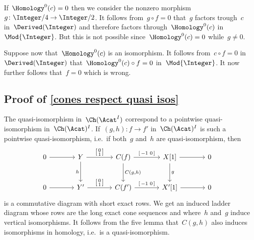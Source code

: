 \documentclass[a4paper,10pt]{scrartcl}
\begin{document}
If~$\Homology^0(c) = 0$ then we consider the nonzero morphism~$g \colon \Integer/4 \to \Integer/2$.
It follows from~$g \circ f = 0$ that~$g$ factors trough~$c$ in~$\Derived(\Integer)$ and therefore factors through~$\Homology^0(c)$ in~$\Mod{\Integer}$.
But this is not possible since~$\Homology^0(c) = 0$ while~$g \neq 0$.

Suppose now that~$\Homology^0(c)$ is an isomorphism.
It follows from~$c \circ f = 0$ in~$\Derived(\Integer)$ that~$\Homology^0(c) \circ f = 0$ in~$\Mod{\Integer}$.
It now further follows that~$f = 0$ which is wrong.



\subsection{Proof of \cref{cones respect quasi isos}}
\label{cones respect quasi isos proof}

The quasi-isomorphism in~$\Ch(\Acat^I)$ correspond to a pointwise quasi-isomorphism in~$\Ch(\Acat)^I$.
If~$(g,h) \colon f \to f'$ in~$\Ch(\Acat)^I$ is such a pointwise quasi-isomorphism, i.e.\ if both~$g$ and~$h$ are quasi-isomorphism, then
\[
  \begin{tikzcd}[sep = large, ampersand replacement = \&]
    0
    \arrow{r}
    \&
    Y
    \arrow{r}[above]{\begin{bsmallmatrix} 0 \\ 1 \end{bsmallmatrix}}
    \arrow{d}[left]{h}
    \&
    C(f)
    \arrow{r}[above]{\begin{bsmallmatrix} -1 & 0 \end{bsmallmatrix}}
    \arrow{d}[right]{C(g,h)}
    \&
    X[1]
    \arrow{r}
    \arrow{d}[right]{g}
    \&
    0
    \\
    0
    \arrow{r}
    \&
    Y'
    \arrow{r}[above]{\begin{bsmallmatrix} 0 \\ 1 \end{bsmallmatrix}}
    \&
    C(f')
    \arrow{r}[above]{\begin{bsmallmatrix} -1 & 0 \end{bsmallmatrix}}
    \&
    X'[1]
    \arrow{r}
    \&
    0
  \end{tikzcd}
\]
is a commutative diagram with short exact rows.
We get an induced ladder diagram whose rows are the long exact cone sequences and where~$h$ and~$g$ induce vertical isomorphisms.
It follows from the five lemma that~$C(g,h)$ also induces isomorphisms in homology, i.e.\ is a quasi-isomorphism.
\end{document}
